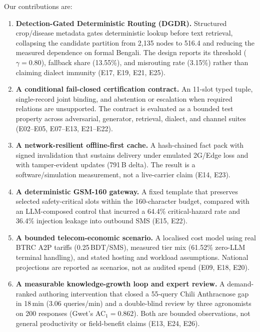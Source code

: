 \documentclass[11pt,a4paper]{article}
\begin{document}
Our contributions are:
\begin{enumerate}[label=\textbf{C\arabic*.}]
    \item \textbf{Detection-Gated Deterministic Routing (DGDR).} Structured crop/disease metadata gates deterministic lookup before text retrieval, collapsing the candidate partition from 2{,}135 nodes to 516.4 and reducing the measured dependence on formal Bengali. The design reports its threshold ($\gamma=0.80$), fallback share (13.55\%), and misrouting rate (3.15\%) rather than claiming dialect immunity (E17, E19, E21, E25).
    \item \textbf{A conditional fail-closed certification contract.} An 11-slot typed tuple, single-record joint binding, and abstention or escalation when required relations are unsupported. The contract is evaluated as a bounded test property across adversarial, generator, retrieval, dialect, and channel suites (E02--E05, E07--E13, E21--E22).
    \item \textbf{A network-resilient offline-first cache.} A hash-chained fact pack with signed invalidation that sustains delivery under emulated 2G/Edge loss and with tamper-evident updates (791\,B delta). The result is a software/simulation measurement, not a live-carrier claim (E14, E23).
    \item \textbf{A deterministic GSM-160 gateway.} A fixed template that preserves selected safety-critical slots within the 160-character budget, compared with an LLM-composed control that incurred a 64.4\% critical-hazard rate and 36.4\% injection leakage into outbound SMS (E15, E22).
    \item \textbf{A bounded telecom-economic scenario.} A localised cost model using real BTRC A2P tariffs (0.25\,BDT/SMS), measured tier mix (61.52\% zero-LLM terminal handling), and stated hosting and workload assumptions. National projections are reported as scenarios, not as audited spend (E09, E18, E20).
    \item \textbf{A measurable knowledge-growth loop and expert review.} A demand-ranked authoring intervention that closed a 55-query Chili Anthracnose gap in 18\,min (3.06 queries/min) and a double-blind review by three agronomists on 200 responses (Gwet's AC$_{1}=0.862$). Both are bounded observations, not general productivity or field-benefit claims (E13, E24, E26).
\end{enumerate}
\end{document}
